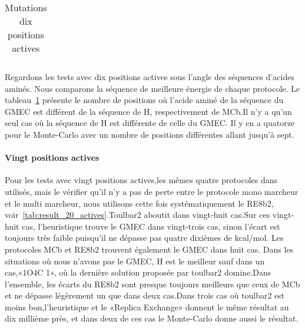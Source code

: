 \begin{table}[h]
\begin{minipage}[t]{.4\linewidth}
{\begin{tabular}{ccc}
 \end{tabular}      
}
 \caption{Mutations dix positions actives }
\label{tab:mutations_10_actives}
\end{minipage}

\end{table}

Regardons les tests avec dix positions actives sous l'angle des séquences d'acides aminés. Nous comparons la séquence de meilleure énergie de chaque protocole. Le tableau~\ref{tab:mutations_10_actives} présente le nombre de positions où l'acide aminé de la séquence du GMEC est différent de la séquence de H, respectivement de MCb.Il n'y a qu'un seul cas où  la séquence de H est différente de celle du GMEC.
Il y en a quatorze pour le Monte-Carlo avec un nombre de positions différentes allant jusqu'à sept.

   \paragraph{Vingt positions actives }

Pour les  tests avec vingt positions actives,les mêmes quatre protocoles dans utilisés, mais le vérifier qu'il n'y a pas de perte entre le protocole mono marcheur et le multi marcheur, nous utilisons cette fois systématiquement le RE8b2, voir~\ref{tab:result_20_actives}.Toulbar2 aboutit dans vingt-huit cas.Sur ces vingt-huit cas, l'heuristique trouve le GMEC dans vingt-trois cas, sinon l'écart est toujours très faible puisqu'il ne dépasse pas quatre dixièmes de kcal/mol. Les protocoles MCb et RE8b2 trouvent également le GMEC dans huit cas. Dans les situations où nous n'avons pas le GMEC, H est le meilleur sauf dans un cas,«1O4C 1», où la dernière solution proposée par toulbar2 domine.Dans l'ensemble, les écarts du RE8b2 sont presque toujours meilleurs que ceux de MCb et ne dépasse légèrement un que dans deux cas.Dans trois cas où toulbar2 est moins bon,l'heuristique et le «Replica Exchange» donnent le même résultat au dix millième près, et dans deux de ces cas le Monte-Carlo donne aussi le résultat.  

